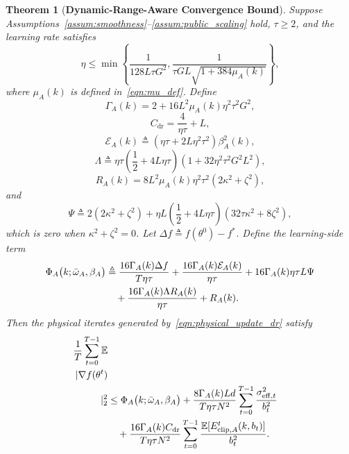 \documentclass[journal]{IEEEtran}
\newtheorem{theorem}{Theorem}
\begin{document}
\begin{theorem}[\bf Dynamic-Range-Aware Convergence Bound]
    \label{thm:main_convergence}
    Suppose Assumptions~\ref{assum:smoothness}--\ref{assum:public_scaling} hold, $\tau\ge2$, and the learning rate satisfies
    \begin{equation}
        \label{eqn:lr_condition_new}
        \eta
        \le
        \min\left\{
            \frac{1}{128L\tau G^2},
            \frac{1}{\tau GL\sqrt{1+384\mu_A(k)}}
        \right\},
    \end{equation}
    where $\mu_A(k)$ is defined in~\eqref{eqn:mu_def}. Define
    \begin{equation}
        \Gamma_A(k)=2+16L^2\mu_A(k)\eta^2\tau^2G^2,
    \end{equation}
    \begin{equation}
        C_{\mathrm{dr}}=\frac{4}{\eta\tau}+L,
    \end{equation}
    \begin{equation}
        \mathcal{E}_A(k)
        \triangleq
        (\eta\tau+2L\eta^2\tau^2)\beta_A^2(k),
    \end{equation}
    \begin{equation}
        \Lambda
        \triangleq
        \eta\tau\left(\frac12+4L\eta\tau\right)
        \left(1+32\eta^2\tau^2G^2L^2\right),
    \end{equation}
    \begin{equation}
        R_A(k)=8L^2\mu_A(k)\eta^2\tau^2(2\kappa^2+\zeta^2),
    \end{equation}
    and
    \begin{equation}
        \Psi
        \triangleq
        2(2\kappa^2+\zeta^2)
        +\eta L\left(\frac12+4L\eta\tau\right)
        (32\tau\kappa^2+8\zeta^2),
    \end{equation}
    which is zero when $\kappa^2+\zeta^2=0$. Let $\Delta f\triangleq f(\theta^0)-f^*$. Define the learning-side term
    \begin{align}
        \label{eqn:phi_def_theorem}
        \Phi_A\big(k;\bar{\omega}_A,\beta_A\big)
        &\triangleq
        \frac{16\Gamma_A(k)\Delta f}{T\eta\tau}
        +\frac{16\Gamma_A(k)\mathcal{E}_A(k)}{\eta\tau}
        +16\Gamma_A(k)\eta\tau L\Psi
        \notag\\
        &\quad+
        \frac{16\Gamma_A(k)\Lambda R_A(k)}{\eta\tau}
        +R_A(k).
    \end{align}
    Then the physical iterates generated by~\eqref{eqn:physical_update_dr} satisfy
    \begin{align}
        \label{eqn:final_dr_convergence_bound_theorem}
        \frac1T\sum_{t=0}^{T-1}\mathbb{E}\\|\nabla f(\theta^t)\\|_2^2
        &\le
        \Phi_A\big(k;\bar{\omega}_A,\beta_A\big)
        +
        \frac{8\Gamma_A(k)Ld}{T\eta\tau N^2}
        \sum_{t=0}^{T-1}\frac{\sigma_{\mathrm{eff},t}^2}{b_t^2}
        \notag\\
        &\quad+
        \frac{16\Gamma_A(k)C_{\mathrm{dr}}}{T\eta\tau N^2}
        \sum_{t=0}^{T-1}
        \frac{\mathbb{E}[E_{\mathrm{clip},A}^t(k,b_t)]}{b_t^2}.
    \end{align}
\end{theorem}
\end{document}
